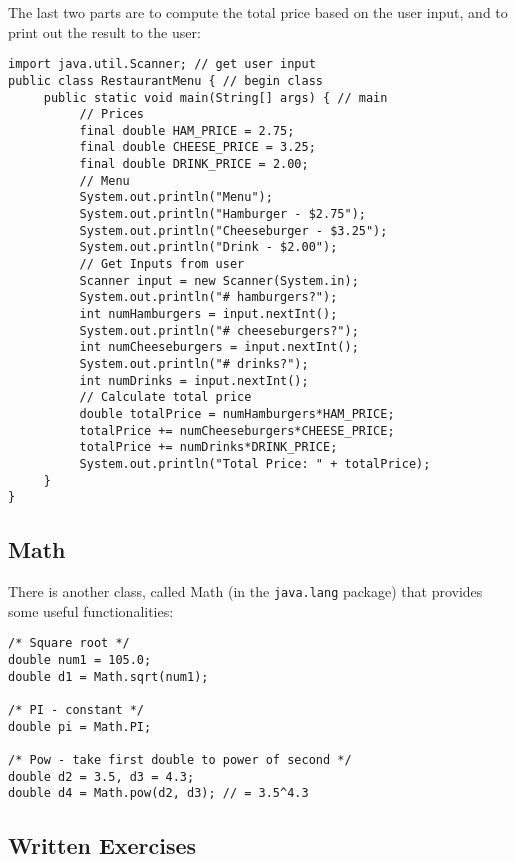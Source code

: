 \noindent The last two parts are to compute the total price based on the user input, and to print out the result to the user:
\begin{lstlisting}
import java.util.Scanner; // get user input
public class RestaurantMenu { // begin class
     public static void main(String[] args) { // main
          // Prices
          final double HAM_PRICE = 2.75;
          final double CHEESE_PRICE = 3.25;
          final double DRINK_PRICE = 2.00;
          // Menu
          System.out.println("Menu");
          System.out.println("Hamburger - $2.75");
          System.out.println("Cheeseburger - $3.25");
          System.out.println("Drink - $2.00");
          // Get Inputs from user
          Scanner input = new Scanner(System.in);
          System.out.println("# hamburgers?");
          int numHamburgers = input.nextInt();
          System.out.println("# cheeseburgers?");
          int numCheeseburgers = input.nextInt();
          System.out.println("# drinks?");
          int numDrinks = input.nextInt();
          // Calculate total price
          double totalPrice = numHamburgers*HAM_PRICE;
          totalPrice += numCheeseburgers*CHEESE_PRICE;
          totalPrice += numDrinks*DRINK_PRICE;
          System.out.println("Total Price: " + totalPrice);
     }
}
\end{lstlisting}

\subsection{Math}
There is another class, called Math (in the \verb|java.lang| package) that provides some useful functionalities:
\begin{lstlisting}
/* Square root */
double num1 = 105.0;
double d1 = Math.sqrt(num1);

/* PI - constant */
double pi = Math.PI; 

/* Pow - take first double to power of second */
double d2 = 3.5, d3 = 4.3;
double d4 = Math.pow(d2, d3); // = 3.5^4.3
\end{lstlisting}


\subsection{Written Exercises}

